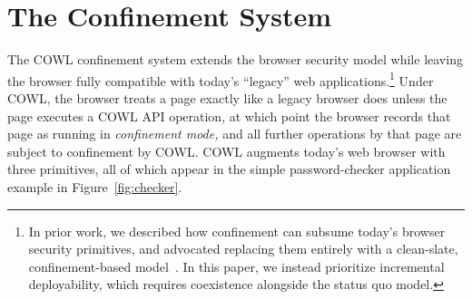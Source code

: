 \section{The \sys{} Confinement System}
\label{sec:system}

The COWL confinement system extends the browser security model while
leaving the browser fully compatible with today's ``legacy'' web
applications.\footnote{In prior work, we described how confinement can
  subsume today's browser security primitives, and advocated replacing
  them entirely with a clean-slate, confinement-based
  model~\cite{yang:2013:towards}. In this paper, we instead prioritize
  incremental deployability, which requires coexistence alongside the
  status quo model.} Under COWL, the browser treats a page exactly
like a legacy browser does unless the page executes a COWL API
operation, at which point the browser records that page as running in
{\em confinement mode,} and all further operations by that page are
subject to confinement by COWL. COWL augments today's web browser with
three primitives, all of which appear in the simple password-checker
application example in Figure~\ref{fig:checker}.
%


%


